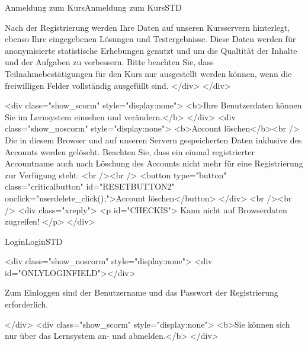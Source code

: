 \begin{MXContent}{Anmeldung zum Kurs}{Anmeldung zum Kurs}{STD}
\begin{html}
Nach der Registrierung werden Ihre Daten auf unseren Kursservern hinterlegt, ebenso Ihre eingegebenen Lösungen und Testergebnisse. Diese Daten werden für anonymisierte
statistische Erhebungen genutzt und um die Qualtität der Inhalte und der Aufgaben zu verbessern. Bitte beachten Sie, dass Teilnahmebestätigungen für den Kurs nur ausgestellt
werden können, wenn die freiwilligen Felder vollständig ausgefüllt sind.
</div>
</div>
\end{html}

% 
% 

\begin{html}
<div class="show_scorm" style="display:none">
<b>Ihre Benutzerdaten können Sie im Lernsystem einsehen und verändern.</b>
</div>
<div class="show_noscorm" style="display:none">
<b>Account löschen</b><br />
Die in diesem Browser und auf unseren Servern gespeicherten Daten inklusive des Accounts werden gelöscht.
Beachten Sie, dass ein einmal registrierter Accountname auch nach Löschung des Accounts nicht mehr für eine Registrierung
zur Verfügung steht.
<br /><br />
<button type="button" class="criticalbutton" id="RESETBUTTON2" onclick="userdelete_click();">Account löschen</button>
</div>
<br /><br />
<div class="xreply">
<p id="CHECKIS">
Kann nicht auf Browserdaten zugreifen!
</p>
</div>
\end{html}


\end{MXContent}

\begin{MXContent}{Login}{Login}{STD}
\MGlobalLoginTag
{}
\begin{html}
<div class="show_noscorm" style="display:none">
<div id="ONLYLOGINFIELD"></div>
\end{html}

Zum Einloggen sind der Benutzername und das Passwort der Registrierung erforderlich.

\begin{html}
</div>
<div class="show_scorm" style="display:none">
<b>Sie können sich nur über das Lernsystem an- und abmelden.</b>
</div>
\end{html}

\end{MXContent}

